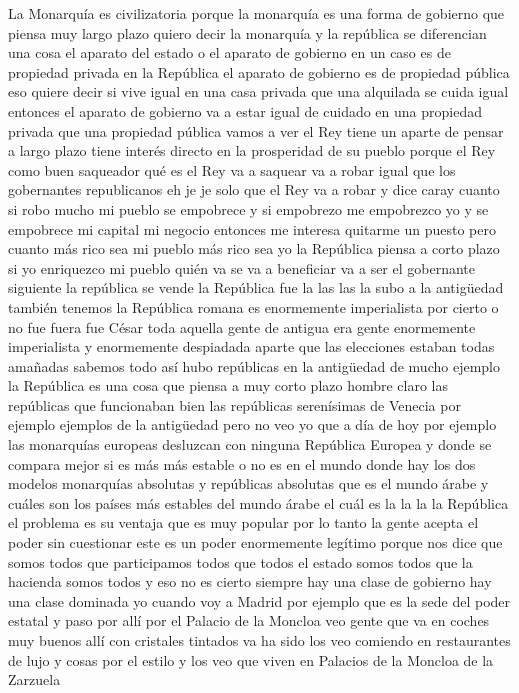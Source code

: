 La Monarquía es civilizatoria
porque la monarquía es una forma de gobierno que piensa muy largo plazo quiero decir la monarquía y la república se diferencian
una cosa el aparato del estado o el aparato de gobierno en un caso es de propiedad privada en la República
el aparato de gobierno es de propiedad pública eso quiere decir
si vive igual en una casa privada que una alquilada se cuida igual
entonces el aparato de gobierno va a estar igual de cuidado en una propiedad privada que una propiedad pública
vamos a ver el Rey tiene un aparte de pensar a largo plazo tiene interés directo en la prosperidad de su pueblo
porque el Rey como buen saqueador qué es el Rey va a saquear va a robar
igual que los gobernantes republicanos eh je je solo que el Rey va a robar y dice caray cuanto
si robo mucho mi pueblo se empobrece y si empobrezo me empobrezco yo y se empobrece
mi capital mi negocio entonces me interesa quitarme un puesto pero cuanto más rico sea mi pueblo más rico sea yo
la República piensa a corto plazo si yo enriquezco mi pueblo quién va se va a beneficiar va a ser el gobernante siguiente
la república se vende la República fue la las las la subo a la antigüedad también tenemos la República romana
es enormemente imperialista por cierto o no fue fuera fue César
toda aquella gente de antigua era gente enormemente imperialista y enormemente despiadada aparte que las elecciones estaban todas amañadas
sabemos todo así hubo repúblicas en la antigüedad de mucho ejemplo la República es una cosa que piensa a muy corto plazo
hombre claro las repúblicas que funcionaban bien las repúblicas serenísimas de Venecia por ejemplo ejemplos de la antigüedad pero no veo yo que a día de hoy por ejemplo
las monarquías europeas desluzcan con ninguna República Europea y donde se compara mejor
si es más más estable o no es en el mundo donde hay los dos modelos monarquías absolutas y repúblicas absolutas
que es el mundo árabe y cuáles son los países más estables del mundo árabe
el cuál es la la la la República el problema es su ventaja
que es muy popular por lo tanto la gente acepta el poder sin cuestionar
este es un poder enormemente legítimo porque nos dice que somos todos que participamos todos que todos el estado somos todos
que la hacienda somos todos y eso no es cierto siempre hay una clase de gobierno hay una clase dominada
yo cuando voy a Madrid por ejemplo que es la sede del poder estatal y paso por allí por el Palacio de la Moncloa
veo gente que va en coches muy buenos allí con cristales tintados va ha sido
los veo comiendo en restaurantes de lujo y cosas por el estilo y los veo que viven en Palacios de la Moncloa de la Zarzuela
